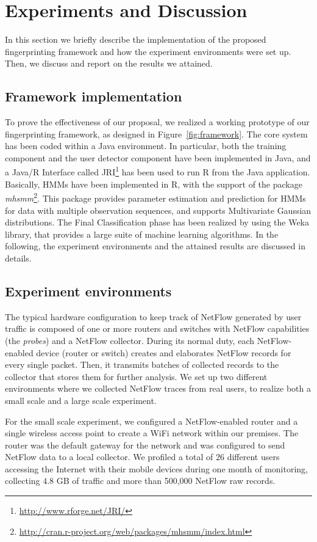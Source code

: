 \documentclass[10pt,conference,compsocconf,letterpaper]{IEEEtran}
\begin{document}
\section{Experiments and Discussion}
\label{sec:experimentsDescription}
In this section we briefly describe the implementation of the proposed
fingerprinting framework and how the experiment environments were set up. Then,
we discuss and report on the results we attained.

\subsection{Framework implementation}
To prove the effectiveness of our proposal, we realized a working
prototype of our fingerprinting framework, as designed in
Figure~\ref{fig:framework}. The core system has been coded within a
Java environment.  In particular, both the
training component and the user detector component have been implemented in Java,
and a Java/R Interface called
JRI\footnote{\small \url{http://www.rforge.net/JRI/}} has been used to run R
from the Java application.  Basically, HMMs have been implemented in R, 
with the support of the package
\emph{mhsmm}\footnote{\small \url{http://cran.r-project.org/web/packages/mhsmm/index.html}}.
This package provides parameter estimation and prediction for HMMs for
data with multiple observation sequences, and supports Multivariate
Gaussian distributions.  The Final
Classification phase has been realized by using the Weka library,
that provides a large suite of machine learning algorithms.  In the
following, the experiment environments and the attained results are
discussed in details.

\subsection{Experiment environments}
\label{sec:expenvironments}
The typical hardware configuration to keep track of NetFlow generated
by user traffic is composed of one or more routers and switches with
NetFlow capabilities (the \textit{probes}) and a NetFlow
collector. During its normal duty, each NetFlow-enabled device (router
or switch) creates and elaborates NetFlow records for every single
packet. Then, it transmits  batches of collected
records to the collector that stores them for further
analysis.  We set up two different environments where we collected NetFlow traces
from real users, to realize both a small scale and a large scale
experiment.

For the small scale experiment, we configured a NetFlow-enabled router
and a single wireless access point to create a WiFi network within our premises. 
The router was the default gateway for the network and was configured to send NetFlow data
to a local collector. We profiled a total of $26$ different
users accessing the Internet with their mobile devices during one
month of monitoring, collecting $4.8$ GB of traffic and more than 
500,000 NetFlow raw records.
\end{document}
